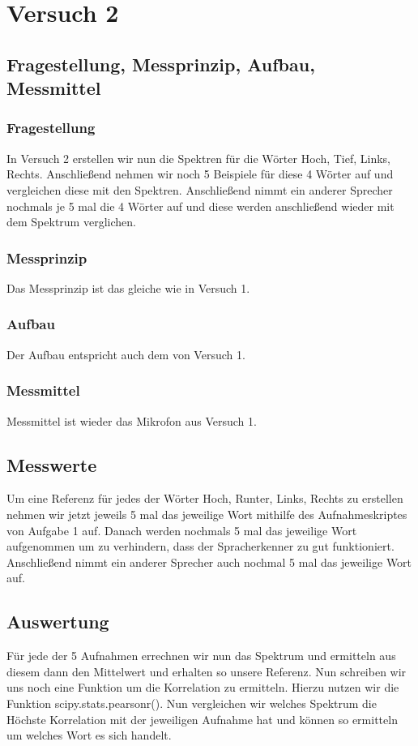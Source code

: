 \documentclass[TGAI_Laborbericht.tex]{subfiles}
\begin{document}
\chapter{Versuch 2}
\label{chap:VERSUCH_2}


\section{Fragestellung, Messprinzip, Aufbau, Messmittel}
\label{chap:VERSUCH_2_FRAGESTELLUNG}
\subsection{Fragestellung}
In Versuch 2 erstellen wir nun die Spektren für die Wörter Hoch, Tief, Links, Rechts. Anschließend nehmen wir noch 5 Beispiele für diese 4 Wörter auf und vergleichen diese mit den Spektren. Anschließend nimmt ein anderer Sprecher nochmals je 5 mal die 4 Wörter auf und diese werden anschließend wieder mit dem Spektrum verglichen.

\subsection{Messprinzip}
Das Messprinzip ist das gleiche wie in Versuch 1.

\subsection{Aufbau}
Der Aufbau entspricht auch dem von Versuch 1.

\subsection{Messmittel}
Messmittel ist wieder das Mikrofon aus Versuch 1.

\section{Messwerte}
\label{chap:VERSUCH_2_MESSWERTE}
Um eine Referenz für jedes der Wörter Hoch, Runter, Links, Rechts zu erstellen nehmen wir jetzt jeweils 5 mal das jeweilige Wort mithilfe des Aufnahmeskriptes von Aufgabe 1 auf. Danach werden nochmals 5 mal das jeweilige Wort aufgenommen um zu verhindern, dass der Spracherkenner zu gut funktioniert. Anschließend nimmt ein anderer Sprecher auch nochmal 5 mal das jeweilige Wort auf.

\section{Auswertung}
\label{chap:VERSUCH_2_AUSWERTUNG}
Für jede der 5 Aufnahmen errechnen wir nun das Spektrum und ermitteln aus diesem dann den Mittelwert und erhalten so unsere Referenz. Nun schreiben wir uns noch eine Funktion um die Korrelation zu ermitteln. Hierzu nutzen wir die Funktion scipy.stats.pearsonr(). Nun vergleichen wir welches Spektrum die Höchste Korrelation mit der jeweiligen Aufnahme hat und können so ermitteln um welches Wort es sich handelt.
\end{document}
